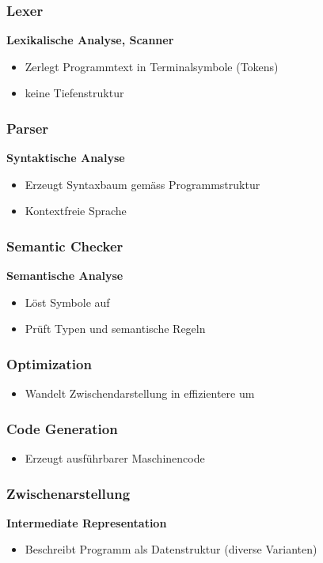 \subsubsection{Lexer}
\textbf{Lexikalische Analyse, Scanner}
\begin{itemize}
    \item Zerlegt Programmtext in Terminalsymbole (Tokens)
    \item keine Tiefenstruktur
\end{itemize}
\subsubsection{Parser}
\textbf{Syntaktische Analyse}
\begin{itemize}
    \item Erzeugt Syntaxbaum gemäss Programmstruktur
    \item Kontextfreie Sprache
\end{itemize}
\subsubsection{Semantic Checker}
\textbf{Semantische Analyse}
\begin{itemize}
    \item Löst Symbole auf
    \item Prüft Typen und semantische Regeln
\end{itemize}
\subsubsection{Optimization}
\begin{itemize}
    \item Wandelt Zwischendarstellung in effizientere um
\end{itemize}
\subsubsection{Code Generation}
\begin{itemize}
    \item Erzeugt ausführbarer Maschinencode
\end{itemize}
\subsubsection{Zwischenarstellung}
\textbf{Intermediate Representation}
\begin{itemize}
    \item Beschreibt Programm als Datenstruktur (diverse Varianten)
\end{itemize}

